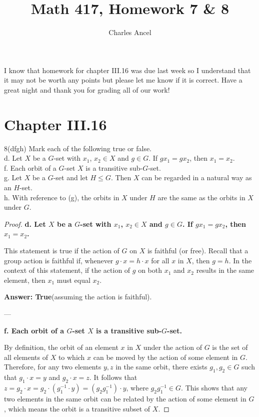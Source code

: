 \documentclass[12pt]{amsart}
\title{Math 417, Homework 7 \& 8}
\author{Charles Ancel}
\theoremstyle{definition}
\numberwithin{equation}{section}
\theoremstyle{plain}
\begin{document}
\maketitle
I know that homework for chapter III.16 was due last week so I understand that it may not be worth any points but please let me know if it is correct. Have a great night and thank you for grading all of our work!
\section*{Chapter III.16}

\begin{exercise}{8(dfgh)}
Mark each of the following true or false. \\
d. Let $X$ be a $G$-set with $x_1$, $x_2 \in X$ and $g \in G$. If $gx_1 = gx_2$, then $x_1 = x_2$. \\
f. Each orbit of a $G$-set $X$ is a transitive sub-$G$-set. \\
g. Let $X$ be a $G$-set and let $H \leq G$. Then $X$ can be regarded in a natural way as an $H$-set. \\
h. With reference to (g), the orbits in $X$ under $H$ are the same as the orbits in $X$ under $G$. \\
    
    \begin{proof}

\textbf{d. Let \(X\) be a \(G\)-set with \(x_1\), \(x_2 \in X\) and \(g \in G\). If \(gx_1 = gx_2\), then \(x_1 = x_2\).}

This statement is true if the action of \(G\) on \(X\) is faithful (or free). Recall that a group action is faithful if, whenever \(g \cdot x = h \cdot x\) for all \(x\) in \(X\), then \(g = h\). In the context of this statement, if the action of \(g\) on both \(x_1\) and \(x_2\) results in the same element, then \(x_1\) must equal \(x_2\).

\textbf{Answer: True}(assuming the action is faithful).

---

\textbf{f. Each orbit of a \(G\)-set \(X\) is a transitive sub-\(G\)-set.}

By definition, the orbit of an element \(x\) in \(X\) under the action of \(G\) is the set of all elements of \(X\) to which \(x\) can be moved by the action of some element in \(G\). Therefore, for any two elements \(y, z\) in the same orbit, there exists \(g_1, g_2 \in G\) such that \(g_1 \cdot x = y\) and \(g_2 \cdot x = z\). It follows that \(z = g_2 \cdot x = g_2 \cdot (g_1^{-1} \cdot y) = (g_2 g_1^{-1}) \cdot y\), where \(g_2 g_1^{-1} \in G\). This shows that any two elements in the same orbit can be related by the action of some element in \(G\), which means the orbit is a transitive subset of \(X\).


\end{proof}
\end{exercise}
\end{document}
